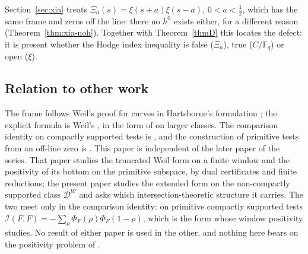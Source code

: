 \documentclass[11pt]{amsart}
\theoremstyle{definition}
\theoremstyle{remark}
\newcommand{\F}{\mathbb F}
\newcommand{\DW}{\mathcal D^{W}}
\newcommand{\I}{\mathcal I}
\begin{document}
Section~\ref{sec:xia} treats $\Xi_a(s)=\xi(s+a)\xi(s-a)$, $0<a<\frac12$, which has the same frame
and zeros off the line: there no $h^0$ exists either, for a different reason
(Theorem~\ref{thm:xia-noh}). Together with Theorem~\ref{thmD} this locates the defect: it is present
whether the Hodge index inequality is false ($\Xi_a$), true ($C/\F_q$) or open ($\xi$).

\subsection{Relation to other work}
The frame follows Weil's proof for curves \cite{Weil48} in Hartshorne's formulation \cite{Hartshorne};
the explicit formula is Weil's \cite{Weil52}, in the form of \cite{Barner1981} on larger classes.
The comparison identity on compactly supported tests is \cite[Thm.~4.1]{Paper45}, and the
construction of primitive tests from an off-line zero is \cite[Thm.~6.2]{Paper45}. This paper is
independent of the later paper \cite{Paper47} of the series. That paper studies the truncated Weil form on a finite window and
the positivity of its bottom on the primitive subspace, by dual certificates and finite reductions;
the present paper studies the extended form on the non-compactly supported class $\DW$ and asks
which intersection-theoretic structure it carries. The two meet only in the comparison identity:
on primitive compactly supported tests $\I(F,F)=-\sum_\rho\Phi_F(\rho)\Phi_F(1-\rho)$, which is the
form whose window positivity \cite{Paper47} studies. No result of either paper is used in the other,
and nothing here bears on the positivity problem of \cite{Paper47}.
\end{document}
